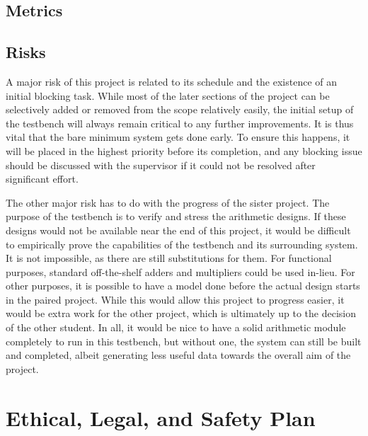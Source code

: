 \documentclass[journal]{IEEEtran}
\begin{document}
\subsection{Metrics}

\subsection{Risks}
A major risk of this project is related to its schedule and the existence of an
initial blocking task.
While most of the later sections of the project can be selectively added or
removed from the scope relatively easily, the initial setup of the testbench
will always remain critical to any further improvements.
It is thus vital that the bare minimum system gets done early.
To ensure this happens, it will be placed in the highest priority before its
completion, and any blocking issue should be discussed with the supervisor if it
could not be resolved after significant effort.

The other major risk has to do with the progress of the sister project.
The purpose of the testbench is to verify and stress the arithmetic designs.
If these designs would not be available near the end of this project,
it would be difficult to empirically prove the capabilities of the testbench
and its surrounding system.
It is not impossible, as there are still substitutions for them.
For functional purposes, standard off-the-shelf adders and multipliers could be
used in-lieu.
For other purposes, it is possible to have a model done before the actual design
starts in the paired project.
While this would allow this project to progress easier, it would be extra work
for the other project, which is ultimately up to the decision of the other
student.
In all, it would be nice to have a solid arithmetic module completely to run
in this testbench, but without one, the system can still be built and completed,
albeit generating less useful data towards the overall aim of the project.

\section{Ethical, Legal, and Safety Plan}
\end{document}

